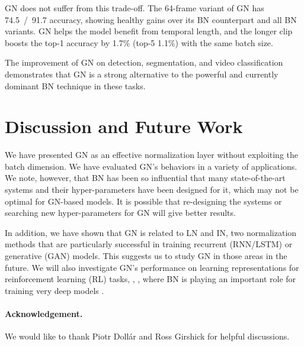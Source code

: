\documentclass[10pt,twocolumn,letterpaper]{article}
\begin{document}
GN does not suffer from this trade-off. The 64-frame variant of GN has 74.5~/~91.7 accuracy, showing healthy gains over its BN counterpart and all BN variants. GN helps the model benefit from temporal length, and the longer clip boosts the top-1 accuracy by 1.7\% (top-5 1.1\%) with the same batch size.  

The improvement of GN on detection, segmentation, and video classification demonstrates that GN is a strong alternative to the powerful and currently dominant BN technique in these tasks.

\section{Discussion and Future Work}

We have presented GN as an effective normalization layer without exploiting the batch dimension. We have evaluated GN's behaviors in a variety of applications. We note, however, that BN has been so influential that many state-of-the-art systems and their hyper-parameters have been designed for it, which may not be optimal for GN-based models. It is possible that re-designing the systems or searching new hyper-parameters for GN will give better results.

In addition, we have shown that GN is related to LN and IN, two normalization methods that are particularly successful in training recurrent (RNN/LSTM) or generative (GAN) models. This suggests us to study GN in those areas in the future. We will also investigate GN's performance on learning representations for reinforcement learning (RL) tasks, \eg, \cite{Silver2017}, where BN is playing an important role for training very deep models \cite{He2016}.

\vspace{.5em}
\paragraph{Acknowledgement.} We would like to thank Piotr Doll\'ar and Ross Girshick for helpful discussions.

{
\small

}
\end{document}
